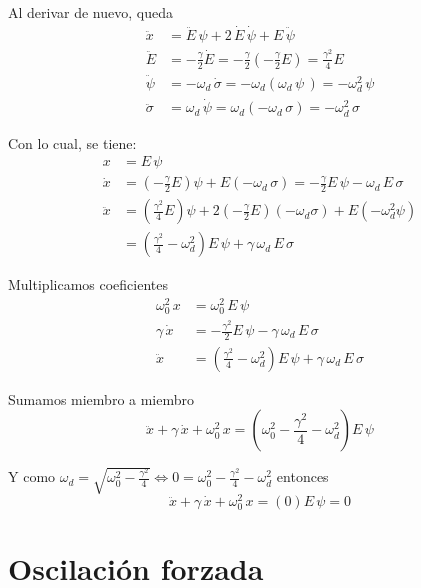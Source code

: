 \documentclass[a5paper,12pt,twoside]{book}
\begin{document}
Al derivar de nuevo, queda
\begin{align*}
    \ddot{x} &= \ddot{E} \, \psi + 2 \, \dot{E} \, \dot{\psi} + E \, \ddot{\psi}
    \\
    \ddot{E} &= - \frac{\gamma}{2} \dot{E}
    = - \frac{\gamma}{2} \left(- \frac{\gamma}{2} E \right)
    = \frac{\gamma^2}{4} E
    \\
    \ddot{\psi} &= -\omega_d \, \dot{\sigma}
    =  - \omega_d \left( \omega_d \, \psi \, \right)
    = - \omega_d^2 \, \psi
    \\
    \ddot{\sigma} &= \omega_d \, \dot{\psi}
    = \omega_d \left( - \omega_d \, \sigma \right)
    = - \omega_d^2 \, \sigma
\end{align*}

Con lo cual, se tiene:
\begin{align*}
    x &= E \, \psi
    \\
    \dot{x} &= \left( - \frac{\gamma}{2} E \right) \psi + E  \left( -\omega_d \, \sigma \right)
    = - \frac{\gamma}{2} E \, \psi - \omega_d \, E \, \sigma
    \\
    \ddot{x} &= \left( \frac{\gamma^2}{4} E \right) \psi + 2 \left( - \frac{\gamma}{2} E \right) \left( -\omega_d \sigma \right) + E \left( - \omega_d^2 \psi \right)
    \\
    &= \left( \frac{\gamma^2}{4} - \omega_d^2 \right) E \, \psi + \gamma \, \omega_d \, E \, \sigma
\end{align*}

Multiplicamos coeficientes
\begin{align*}
    \omega_0^2 \, x &= \omega_0^2 \, E \, \psi
    \\
    \gamma \, \dot{x} &= - \frac{\gamma^2}{2} E \, \psi - \gamma \, \omega_d \, E \, \sigma
    \\
    \ddot{x} &= \left( \frac{\gamma^2}{4} - \omega_d^2 \right) E \, \psi + \gamma \, \omega_d \, E \, \sigma
\end{align*}

Sumamos miembro a miembro
\[
    \ddot{x} + \gamma \, \dot{x} + \omega_{0}^{2} \, x = \left( \omega_0^2 - \frac{\gamma^2}{4} - \omega_d^2 \right) E \, \psi
\]

Y como
$\omega_d = \sqrt{\omega_0^2 - \frac{\gamma^2}{4}} \iff 0 = \omega_0^2 - \frac{\gamma^2}{4} - \omega_d^2$
entonces
\[
  \ddot{x} + \gamma \, \dot{x} + \omega_{0}^{2} \, x = \left( 0 \right) E \, \psi = 0
\]


\section{Oscilación forzada}
\end{document}
